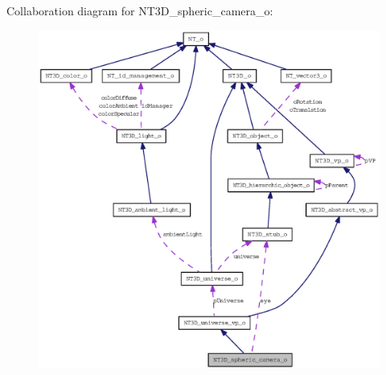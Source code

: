 Collaboration diagram for NT3D\_\-spheric\_\-camera\_\-o:
\nopagebreak
\begin{figure}[H]
\begin{center}
\leavevmode
\includegraphics[width=400pt]{class_n_t3_d__spheric__camera__o__coll__graph}
\end{center}
\end{figure}
